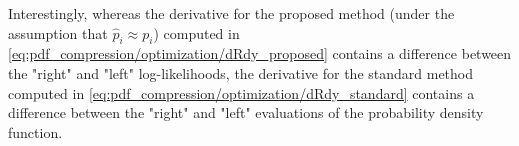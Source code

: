 Interestingly, whereas the derivative for the proposed method (under the assumption that $\hat{p}_i \approx p_i$) computed in \cref{eq:pdf_compression/optimization/dRdy_proposed} contains a difference between the "right" and "left" log-likelihoods,
the derivative for the standard method computed in \cref{eq:pdf_compression/optimization/dRdy_standard} contains a difference between the "right" and "left" evaluations of the probability density function.













%

